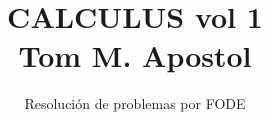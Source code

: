 \normalfont

\author{\Large Resolución de problemas por FODE}
\title{CALCULUS vol 1\\ \small Tom M. Apostol}
\date{}
\pagestyle{empty}
\maketitle
\thispagestyle{empty}
\let\cleardoublepage\clearpage
\tableofcontents 								%


 
\let\cleardoublepage\clearpage